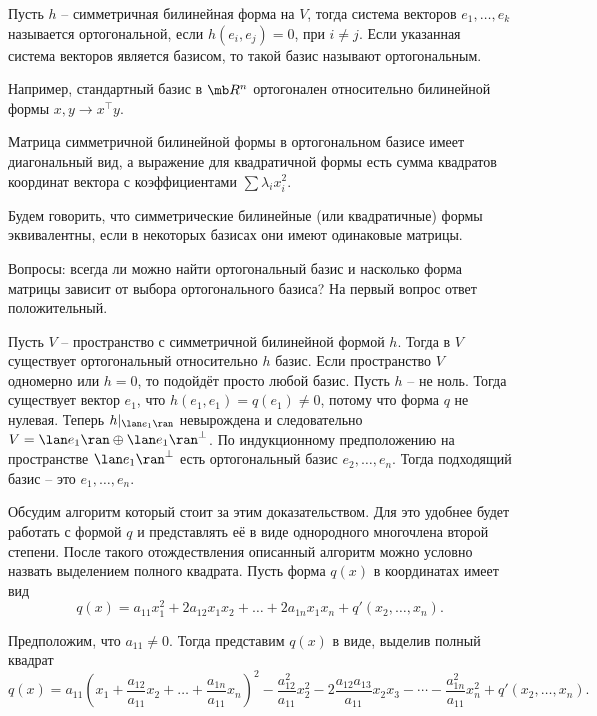 \dfn Пусть $h$ -- симметричная билинейная форма на $V$, тогда система векторов $e_1,\dots,e_k$ называется ортогональной, если $h(e_i,e_j)=0$, при $i\neq j$. Если указанная система векторов является базисом, то такой базис называют ортогональным.
\edfn

Например, стандартный базис в $\mb R^n$ ортогонален относительно билинейной формы $x,y \to x^\top y$.

\rm Матрица симметричной билинейной формы в ортогональном базисе имеет диагональный вид, а выражение для квадратичной формы есть сумма квадратов координат вектора с коэффициентами $\sum \lambda_i x_i^2$.
\erm

\dfn Будем говорить, что симметрические билинейные (или квадратичные) формы эквивалентны, если в некоторых базисах они имеют одинаковые матрицы.
\edfn

Вопросы: всегда ли можно найти ортогональный базис и насколько форма матрицы зависит от выбора ортогонального базиса? На первый вопрос ответ положительный.

\thrm Пусть $V$ -- пространство с симметричной билинейной формой $h$. Тогда в $V$ существует ортогональный относительно $h$ базис. 
\ethrm
\proof
Если пространство $V$ одномерно или $h=0$, то подойдёт просто любой базис. Пусть $h$ -- не ноль. Тогда существует вектор $e_1$, что $h(e_1,e_1)=q(e_1)\neq 0$, потому что форма $q$ не нулевая. Теперь $h|_{\lan e_1\ran}$ невырождена и следовательно $V=\lan e_1 \ran \oplus \lan e_1 \ran^{\bot}$. По индукционному предположению на пространстве $\lan e_1 \ran^{\bot}$ есть ортогональный базис $e_2,\dots,e_n$. Тогда подходящий базис -- это $e_1,\dots,e_n$. 
\endproof







Обсудим алгоритм который стоит за этим доказательством. Для это удобнее будет работать с формой $q$ и представлять её в виде однородного многочлена второй степени. После такого отождествления описанный алгоритм можно условно назвать выделением полного квадрата. Пусть форма $q(x)$ в координатах имеет вид
$$q(x)= a_{11}x_1^2+ 2a_{12}x_1x_2 + \dots + 2a_{1n}x_1x_n  + q'(x_2, \dots, x_n).$$

 Предположим, что $a_{11}\neq 0$. Тогда представим $q(x)$ в виде, выделив полный квадрат 
$$q(x)= a_{11}\left(x_1+\frac{a_{12}}{a_{11}}x_2 + \dots +\frac{a_{1n}}{a_{11}}x_n\right)^2 - \frac{a_{12}^2}{a_{11}}x_2^2 - 2\frac{a_{12}a_{13}}{a_{11}}x_2x_3 - \cdots - \frac{a_{1n}^2}{a_{11}}x_n^2 + q'(x_2,\dots,x_n).$$

